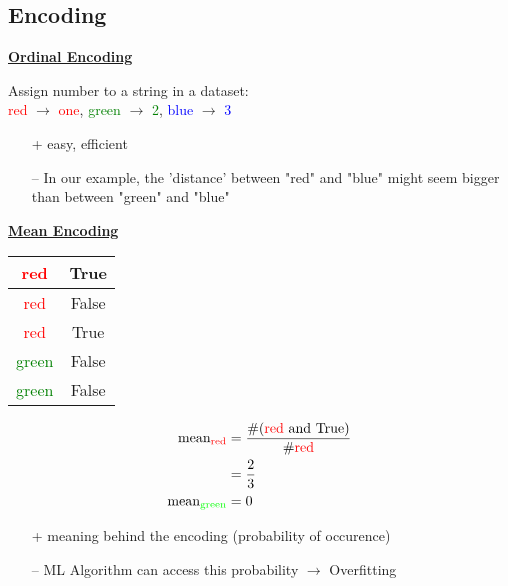 \subsection{Encoding}
    {\centering \underline{\textbf{Ordinal Encoding}} \par}
    Assign number to a string in a dataset:\\
    \textcolor{red}{red} $\rightarrow$ \textcolor{red}{one}, \textcolor{green}{green} $\rightarrow$ \textcolor{green}{2}, \textcolor{blue}{blue} $\rightarrow$ \textcolor{blue}{3}\\
    \begin{itemize}
        \item[+] easy, efficient
        \item[--] In our example, the 'distance' between "red" and "blue" might seem bigger than between "green" and "blue"
    \end{itemize}

    {\centering \underline{\textbf{Mean Encoding}} \par}
    \begin{minipage}{0.29\linewidth}
        \begin{tabular*}{\linewidth}{c | c}
            \textcolor{red}{red} & True\\
            \hline
            \textcolor{red}{red} & False\\
            \hline
            \textcolor{red}{red} & True\\
            \hline
            \textcolor{green}{green} & False\\
            \hline
            \textcolor{green}{green} & False        
        \end{tabular*}
    \end{minipage}
    \begin{minipage}{0.69\linewidth}
        \begin{align*}
            \text{mean}_{\text{\textcolor{red}{red}}} &= \frac{\# (\text{\textcolor{red}{red} and True})}{\# \text{\textcolor{red}{red}}}\\
            &= \frac{2}{3}\\
            \text{mean}_{\text{\textcolor{green}{green}}} &= 0
        \end{align*}
    \end{minipage}

    \begin{itemize}
        \item[+] meaning behind the encoding (probability of occurence)
        \item[--] ML Algorithm can access this probability $\rightarrow$ Overfitting
    \end{itemize}
    

